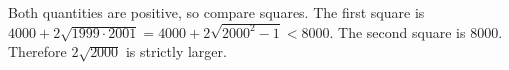 Both quantities are positive, so compare squares. The first square is $4000+2\sqrt{1999\cdot 2001}=4000+2\sqrt{2000^2-1}<8000$. The second square is $8000$. Therefore $\boxed{2\sqrt{2000}}$ is strictly larger.
